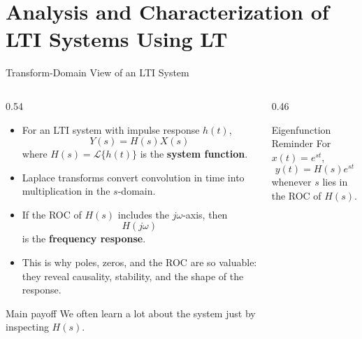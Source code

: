 \section{Analysis and Characterization of LTI Systems Using LT}

\begin{frame}[t]{Transform-Domain View of an LTI System}
  \small
  \begin{columns}[T]
    \begin{column}{0.54\textwidth}
      \begin{itemize}
        \item For an LTI system with impulse response $h(t)$,
          \[
            Y(s)=H(s)X(s)
          \]
          where $H(s)=\mathcal{L}\{h(t)\}$ is the \textbf{system function}.
        \item Laplace transforms convert convolution in time into multiplication in the $s$-domain.
        \item If the ROC of $H(s)$ includes the $j\omega$-axis, then
          \[
            H(j\omega)
          \]
          is the \textbf{frequency response}.
        \item This is why poles, zeros, and the ROC are so valuable:
          they reveal causality, stability, and the shape of the response.
      \end{itemize}

      \begin{insightbox}{Main payoff}
        We often learn a lot about the system just by inspecting $H(s)$.
      \end{insightbox}
    \end{column}
    \begin{column}{0.46\textwidth}
      \begin{center}
      \end{center}

      \vspace{0.12cm}
      \begin{conceptbox}{Eigenfunction Reminder}
        For $x(t)=e^{st}$,
        \[
          y(t)=H(s)e^{st}
        \]
        whenever $s$ lies in the ROC of $H(s)$.
      \end{conceptbox}
    \end{column}
  \end{columns}
\end{frame}

